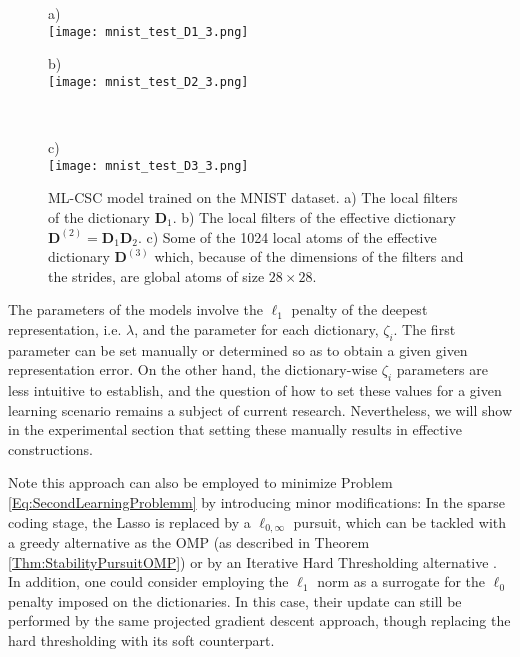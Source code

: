 \documentclass[10pt,journal]{IEEEtran}
\def\D{{\mathbf D}}
\theoremstyle{plain}
\theoremstyle{definition}
\begin{document}
\begin{figure*}
\begin{center}
		
	\begin{minipage}{.22\textwidth}
		a) \\[.3cm]
		\texttt{[image: mnist\_test\_D1\_3.png]}
	\end{minipage} 
		\begin{minipage}{.72\textwidth}
		b) \\[.3cm]
		\texttt{[image: mnist\_test\_D2\_3.png]}
	\end{minipage}\\[.2cm]

	\begin{minipage}{.95\textwidth}
		c) \\[.3cm]
		\texttt{[image: mnist\_test\_D3\_3.png]}
	\end{minipage}
\caption{ML-CSC model trained on the MNIST dataset. a) The local filters of the dictionary $\D_1$. b) The local filters of the effective dictionary $\D^{(2)} = \D_1\D_2$. c) Some of the 1024 local atoms of the effective dictionary $\D^{(3)}$ which, because of the dimensions of the filters and the strides, are global atoms of size $28\times28$.}
\label{fig:MnistModel}
\end{center}
\end{figure*}

The parameters of the models involve the $\ell_1$ penalty of the deepest representation, i.e. $\lambda$, and the parameter for each dictionary, $\zeta_i$. The first parameter can be set manually or determined so as to obtain a given given representation error. On the other hand, the dictionary-wise $\zeta_i$ parameters are less intuitive to establish, and the question of how to set these values for a given learning scenario remains a subject of current research. Nevertheless, we will show in the experimental section that setting these manually results in effective constructions.

Note this approach can also be employed to minimize Problem \eqref{Eq:SecondLearningProblemm} by introducing minor modifications: In the sparse coding stage, the Lasso is replaced by a $\ell_{0,\infty}$ pursuit, which can be tackled with a greedy alternative as the OMP (as described in Theorem \ref{Thm:StabilityPursuitOMP}) or by an Iterative Hard Thresholding alternative \cite{Blumensath2008}. In addition, one could consider employing the $\ell_1$ norm as a surrogate for the $\ell_0$ penalty imposed on the dictionaries. In this case, their update can still be performed by the same projected gradient descent approach, though replacing the hard thresholding with its soft counterpart.
\end{document}
